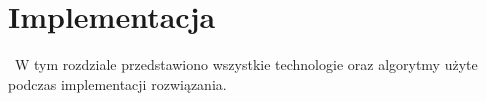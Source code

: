 \chapter{Implementacja}
\label{cha:projekt}
~W tym rozdziale przedstawiono wszystkie technologie oraz algorytmy użyte podczas implementacji rozwiązania.

